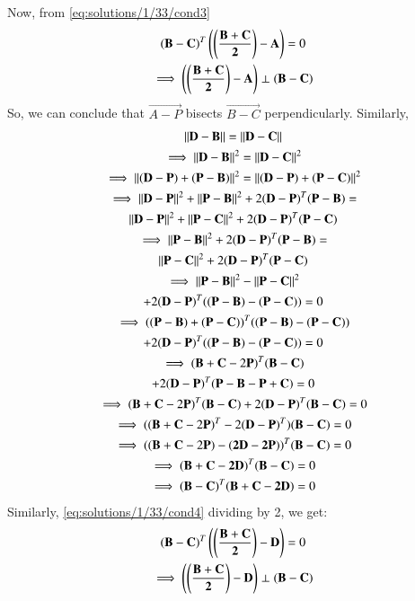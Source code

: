 Now, from \ref{eq:solutions/1/33/cond3}
\begin{multline}
(\mathbf{B-C})^T \left(\mathbf{\left(\frac{B+C}{2}\right)-A}\right)=0\\
\implies \left(\mathbf{\left(\frac{B+C}{2}\right)-A}\right) \perp (\mathbf{B-C})
\end{multline}
So, we can conclude that $\vec{A-P}$ bisects $\vec{B-C}$ perpendicularly.
Similarly, 
\begin{multline}
\left\lVert\mathbf{D-B}\right\rVert = \left\lVert\mathbf{D-C}\right\rVert\\
\implies \left\lVert\mathbf{D-B}\right\rVert^2 = \left\lVert\mathbf{D-C}\right\rVert^2\\
\implies \left\lVert{(\mathbf{D-P}) + (\mathbf{P-B})}\right\rVert^2 = \left\lVert{(\mathbf{D-P}) + (\mathbf{P-C})}\right\rVert^2\\
\implies \left\lVert\mathbf{D-P}\right\rVert^2 + \left\lVert\mathbf{P-B}\right\rVert^2 + 2(\mathbf{D-P})^T (\mathbf{P-B})=\\
\left\lVert\mathbf{D-P}\right\rVert^2 + \left\lVert\mathbf{P-C}\right\rVert^2 + 2(\mathbf{D-P})^T (\mathbf{P-C})\\
\implies \left\lVert\mathbf{P-B}\right\rVert^2 + 2(\mathbf{D-P})^T (\mathbf{P-B})=\\
\left\lVert\mathbf{P-C}\right\rVert^2 + 2(\mathbf{D-P})^T (\mathbf{P-C})\\
\implies \left\lVert\mathbf{P-B}\right\rVert^2 -\left\lVert\mathbf{P-C}\right\rVert^2\\
 + 2(\mathbf{D-P})^T ((\mathbf{P-B})-(\mathbf{P-C})) =0\\
\implies ((\mathbf{P-B})+(\mathbf{P-C}))^T ((\mathbf{P-B})-(\mathbf{P-C}))\\
+ 2(\mathbf{D-P})^T ((\mathbf{P-B})-(\mathbf{P-C})) =0\\
\implies (\mathbf{B}+\mathbf{C}-2\mathbf{P})^T (\mathbf{B-C})\\
+2(\mathbf{D-P})^T (\mathbf{P}-\mathbf{B}-\mathbf{P}+\mathbf{C}) =0\\
\implies (\mathbf{B}+\mathbf{C}-2\mathbf{P})^T (\mathbf{B-C})+2(\mathbf{D-P})^T (\mathbf{B-C}) =0\\
\implies ((\mathbf{B}+\mathbf{C}-2\mathbf{P})^T - 2(\mathbf{D-P})^T) (\mathbf{B-C})=0\\
\implies ((\mathbf{B}+\mathbf{C}-2\mathbf{P})-(\mathbf{2D-2P}))^T (\mathbf{B-C})=0\\
\implies (\mathbf{B+C-2D})^T (\mathbf{B-C})=0\\
\implies (\mathbf{B-C})^T (\mathbf{B+C-2D})=0\\
\label{eq:solutions/1/33/cond4}
\end{multline}
Similarly, \ref{eq:solutions/1/33/cond4} dividing by 2, we get:
\begin{multline}
(\mathbf{B-C})^T \left(\mathbf{\left(\frac{B+C}{2}\right)-D}\right)=0\\
\implies \left(\mathbf{\left(\frac{B+C}{2}\right)-D}\right) \perp (\mathbf{B-C})
\end{multline}
